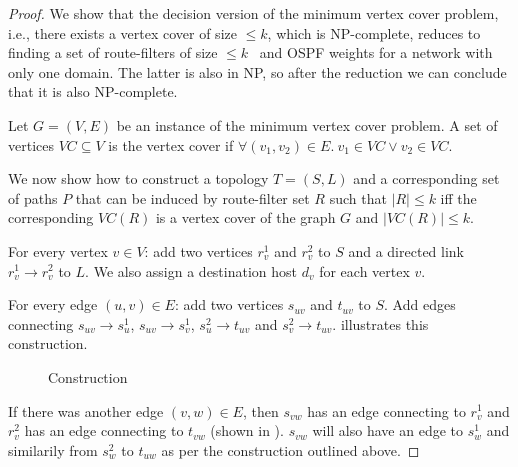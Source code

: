 \begin{proof}
We show that the decision version of the minimum 
vertex cover problem, i.e., there exists a vertex cover
of size $ \leq k$, which is NP-complete, 
reduces to finding a set of route-filters of size $ \leq k$ \
and OSPF weights for a network with only one domain. 
The latter is also in NP, so after the reduction we 
can conclude that it is also NP-complete.

Let $G = (V,E)$ be an instance of the 
minimum vertex cover problem. A set of
vertices $VC \subseteq V$ is the vertex cover
if $\forall (v_1, v_2) \in E. ~v_1 \in VC \vee v_2 \in VC$. 

We now show how to construct a topology $T=(S,L)$ 
and a corresponding set of paths $P$ that can be 
induced by route-filter set $R$ such that $|R| \leq k$  
iff the corresponding $VC(R)$ is a vertex cover of 
the graph $G$ and $|VC(R)| \leq k$.

For every vertex $v \in V$: add two vertices $r_v^1$ 
and $r_v^2$ to $S$ and a directed link $r_v^1 \rightarrow r_v^2$ to $L$. 
We also assign a destination host $d_v$ for each vertex $v$. 

For every edge $(u,v) \in E$: add two vertices $s_{uv}$
and $t_{uv}$ to $S$. Add edges
connecting $s_{uv} \rightarrow s_{u}^1$, $s_{uv} \rightarrow s_{v}^1$,
$s_{u}^2 \rightarrow t_{uv}$ and $s_{v}^2 \rightarrow t_{uv}$.  illustrates this construction.
\begin{figure}[H]
	\centering
	\caption{Construction}
	\label{fig:rfcomplexity}
\end{figure}
If there was another edge $(v,w) \in E$, then
$s_{vw}$ has an edge connecting to $r_v^1$ and
$r_v^2$ has an edge connecting to $t_{vw}$ (shown
in ). $s_{vw}$ will also 
have an edge to $s_w^1$ and similarily from $s_w^2$ to $t_{uw}$
as per the construction outlined above.


\end{proof}
